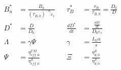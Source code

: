 \documentclass{article}
\begin{document}
\begin{align}
    B_n^{*} &= \frac{B_n}{(\tau_{B,0})^{-n}\dot{\varepsilon}_c} && \tau^{*}_{B} &= \frac{\tau_{B}}{\tau_{B,0}} = \frac{D_0}{D}\\ 
    D^{*} &= \frac{D}{D_0}  && \frac{dD^{*}}{dt} &= \frac{\frac{dD}{dt}}{D_0 \dot{\varepsilon}_c} \\
    \Lambda &= \gamma \Psi && \gamma &= \frac{L_0\alpha}{s} \\ 
    \Psi &= \frac{\eta^{UM}_{eff,0}}{\eta^{S}_{eff,0}} && \Xi &= \frac{\eta^{S}_{d,0}}{\eta^{S}_{d,0}}
\end{align}
\end{document}

